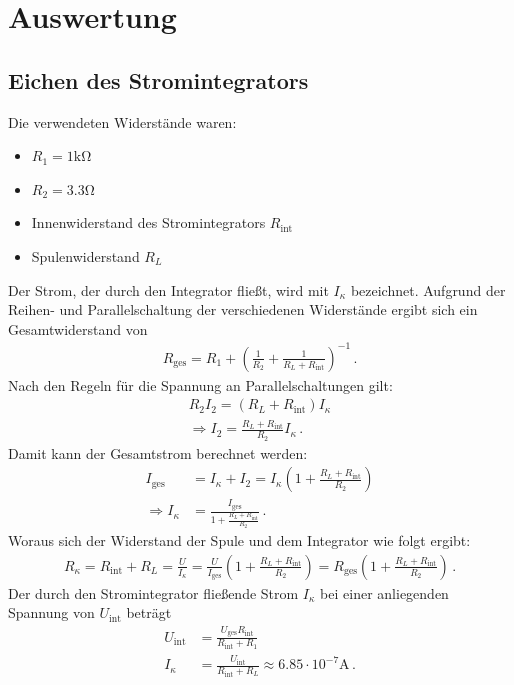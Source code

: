 \documentclass[12pt,a4paper,titlepage,headinclude,bibtotoc]{scrartcl}
\begin{document}
\section{Auswertung}
\label{sec:auswertung}
\subsection{Eichen des Stromintegrators}
Die verwendeten Widerstände waren:
\begin{itemize}
	\item $R_1=1\si{\kilo\ohm}$
	\item $R_2=3.3\si\ohm$
	\item Innenwiderstand des Stromintegrators $R_\text{int}$
	\item Spulenwiderstand $R_L$
\end{itemize}
Der Strom, der durch den Integrator fließt, wird mit $I_\kappa$ bezeichnet.
Aufgrund der Reihen- und Parallelschaltung der verschiedenen Widerstände ergibt sich ein Gesamtwiderstand von 
\begin{align}
		R_\text{ges}=R_1+\left(\frac{1}{R_2}+\frac{1}{R_L+R_\text{int}}\right)^{-1}\,.
\end{align}
Nach den Regeln für die Spannung an Parallelschaltungen gilt:
\begin{align*}
	R_2 I_2=(R_L+R_\text{int})I_\kappa\\
	\Rightarrow I_2=\frac{R_L+R_\text{int}}{R_2}I_\kappa\,.
\end{align*}
Damit kann der Gesamtstrom berechnet werden:
\begin{align*}
	I_\text{ges}&=I_\kappa+I_2=I_\kappa\left(1+\frac{R_L+R_\text{int}}{R_2}\right)\\
	\Rightarrow I_\kappa&=\frac{I_\text{ges}}{1+\frac{R_L+R_\text{int}}{R_2}}\,.
\end{align*}
Woraus sich der Widerstand der Spule und dem Integrator wie folgt ergibt:
\begin{align}
	R_\kappa=R_\text{int}+R_L=\frac U{I_\kappa}=\frac{U}{I_\text{ges}}\left(1+\frac{R_L+R_\text{int}}{R_2}\right)=R_\text{ges}\left(1+\frac{R_L+R_\text{int}}{R_2}\right)\,.
\end{align}
Der durch den Stromintegrator fließende Strom $I_\kappa$ bei einer anliegenden Spannung von $U_\text{int}$ beträgt
\begin{align}
	U_\text{int}&=\frac{U_\text{ges}R_\text{int}}{R_\text{int}+R_1}\\
	I_\kappa&=\frac{U_\text{int}}{R_\text{int}+R_L}\approx 6.85\cdot 10^{-7}\si\ampere\,.
\end{align}
\end{document}
